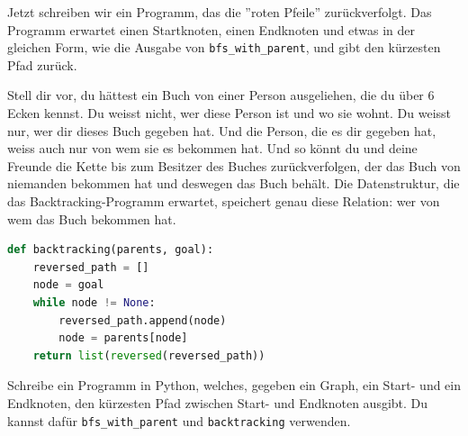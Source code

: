 Jetzt schreiben wir ein Programm, das die ''roten Pfeile'' zurückverfolgt. Das Programm erwartet einen Startknoten, einen Endknoten und etwas in der gleichen Form, wie die Ausgabe von \texttt{bfs\_with\_parent}, und gibt den kürzesten Pfad zurück.
 
Stell dir vor, du hättest ein Buch von einer Person ausgeliehen, die du über 6 Ecken kennst. Du weisst nicht, wer diese Person ist und wo sie wohnt. Du weisst nur, wer dir dieses Buch gegeben hat. Und die Person, die es dir gegeben hat, weiss auch nur von wem sie es bekommen hat. Und so könnt du und deine Freunde die Kette bis zum Besitzer des Buches zurückverfolgen, der das Buch von niemanden bekommen hat und deswegen das Buch behält. Die Datenstruktur, die das Backtracking-Programm erwartet, speichert genau diese Relation: wer von wem das Buch bekommen hat.

\begin{lstlisting}[language=Python, caption={Programm, welches rote Pfeile zurückverfolgt}, label={backtracking}]
def backtracking(parents, goal):
    reversed_path = []
    node = goal
    while node != None:
        reversed_path.append(node)
        node = parents[node]
    return list(reversed(reversed_path))
\end{lstlisting}

\begin{aufgabe}\label{aufgabe_shortest_path}
Schreibe ein Programm in Python, welches, gegeben ein Graph, ein Start- und ein Endknoten, den kürzesten Pfad zwischen Start- und Endknoten ausgibt. Du kannst dafür \texttt{bfs\_with\_parent} und \texttt{backtracking} verwenden.
\end{aufgabe}

